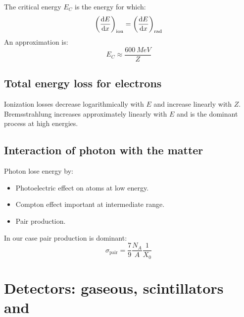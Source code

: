 \documentclass[../../main/main.tex]{subfiles}
\begin{document}
The critical energy \( E_C \) is the energy for which:
\begin{equation}
    \qty(\dv{E}{x})_\mathrm{ion}
    =
    \qty(\dv{E}{x})_\mathrm{rad}
    \label{eq:}
\end{equation}
An approximation is:
\begin{equation}
    E_C
    \approx
    \frac{600 \ \si{MeV}}{Z}
    \label{eq:}
\end{equation}



\subsection{Total energy loss for electrons}
Ionization losses decrease logarithmically with \( E \) and increase linearly with \( Z \). Bremsstrahlung increases approximately linearly with \( E \) and is the dominant process at high energies.



\subsection{Interaction of photon with the matter}
Photon lose energy by:
\begin{itemize}
    \item Photoelectric effect on atoms at low energy.
    \item Compton effect important at intermediate range.
    \item Pair production.
\end{itemize}
In our case pair production is dominant:
\begin{equation}
    \sigma_\mathrm{pair}
    =
    \frac{7}{9} \frac{N_A}{A} \frac{1}{X_0}
    \label{eq:}
\end{equation}





\section{Detectors: gaseous, scintillators and }
\end{document}
